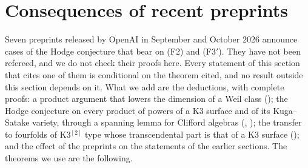 \section{Consequences of recent preprints}\label{sec:preprints}

Seven preprints released by OpenAI in September and October 2026
\cite{OAI26a,OAI26b,OAI26c,OAI26d,OAI26e,OAI26f,OAI26g} announce cases of the
Hodge conjecture that bear on (F2) and \textup{(F3$'$)}. They have not been
refereed, and we do not check their proofs here. Every statement of this
section that cites one of them is conditional on the theorem cited, and no
result outside this section depends on it. What we add are the deductions,
with complete proofs: a product argument that lowers the dimension of a Weil
class (); the Hodge conjecture on every product of
powers of a K3 surface and of its Kuga--Satake variety, through a spanning
lemma for Clifford algebras (, );
the transfer to fourfolds of K3$^{[2]}$ type whose transcendental part is
that of a K3 surface (); and the effect of the
preprints on the statements of the earlier sections. The theorems we use are
the following.
